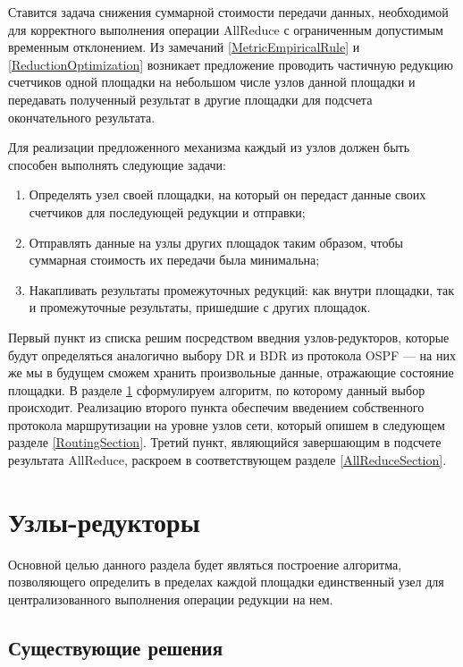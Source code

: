 \documentclass{article}
\theoremstyle{plain}
\theoremstyle{plain}
\theoremstyle{plain}
\theoremstyle{plain}
\theoremstyle{definition}
\theoremstyle{remark}
\theoremstyle{plain}
\begin{document}
Ставится задача снижения суммарной стоимости передачи данных, необходимой для корректного выполнения операции AllReduce с ограниченным допустимым временным отклонением. Из замечаний \ref{MetricEmpiricalRule} и \ref{ReductionOptimization} возникает предложение проводить частичную редукцию счетчиков одной площадки на небольшом числе узлов данной площадки и передавать полученный результат в другие площадки для подсчета окончательного результата.

Для реализации предложенного механизма каждый из узлов должен быть способен выполнять следующие задачи:

\begin{enumerate}
    \item Определять узел своей площадки, на который он передаст данные своих счетчиков для последующей редукции и отправки;
    
    \item Отправлять данные на узлы других площадок таким образом, чтобы суммарная стоимость их передачи была минимальна;
    
    \item Накапливать результаты промежуточных редукций: как внутри площадки, так и промежуточные результаты, пришедшие с других площадок.
\end{enumerate}

Первый пункт из списка решим посредством введния узлов-редукторов, которые будут определяться аналогично выбору DR и BDR из протокола OSPF \cite[с.~75]{RFC2328} --- на них же мы в будущем сможем хранить произвольные данные, отражающие состояние площадки. В разделе \ref{ReducersSection} сформулируем алгоритм, по которому данный выбор происходит. Реализацию второго пункта обеспечим введением собственного протокола маршрутизации на уровне узлов сети, который опишем в следующем разделе \ref{RoutingSection}. Третий пункт, являющийся завершающим в подсчете результата AllReduce, раскроем в соответствующем разделе \ref{AllReduceSection}.

\section{Узлы-редукторы}
\label{ReducersSection}

Основной целью данного раздела будет являться построение алгоритма, позволяющего определить в пределах каждой площадки единственный узел для централизованного выполнения операции редукции на нем.

\subsection{Существующие решения}
\end{document}
